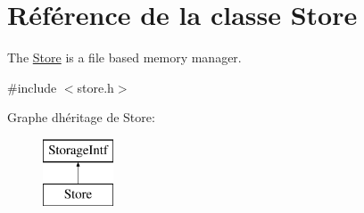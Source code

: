 \hypertarget{class_store}{}\section{Référence de la classe Store}
\label{class_store}


The \hyperlink{class_store}{Store} is a file based memory manager.  




{\ttfamily \#include $<$store.\+h$>$}

Graphe d\textquotesingle{}héritage de Store\+:\begin{figure}[H]
\begin{center}
\leavevmode
\includegraphics[height=2.000000cm]{class_store}
\end{center}
\end{figure}
